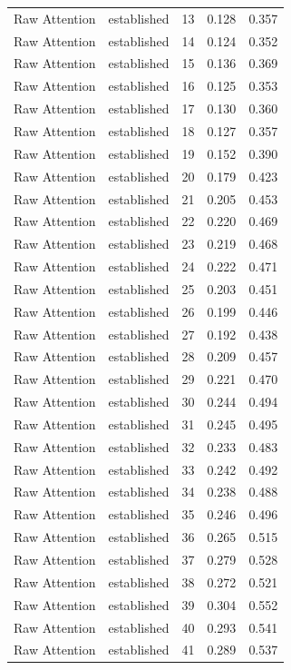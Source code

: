 \begin{tabular}{llrrr}
Raw Attention & established & 13 & 0.128 & 0.357 \\
Raw Attention & established & 14 & 0.124 & 0.352 \\
Raw Attention & established & 15 & 0.136 & 0.369 \\
Raw Attention & established & 16 & 0.125 & 0.353 \\
Raw Attention & established & 17 & 0.130 & 0.360 \\
Raw Attention & established & 18 & 0.127 & 0.357 \\
Raw Attention & established & 19 & 0.152 & 0.390 \\
Raw Attention & established & 20 & 0.179 & 0.423 \\
Raw Attention & established & 21 & 0.205 & 0.453 \\
Raw Attention & established & 22 & 0.220 & 0.469 \\
Raw Attention & established & 23 & 0.219 & 0.468 \\
Raw Attention & established & 24 & 0.222 & 0.471 \\
Raw Attention & established & 25 & 0.203 & 0.451 \\
Raw Attention & established & 26 & 0.199 & 0.446 \\
Raw Attention & established & 27 & 0.192 & 0.438 \\
Raw Attention & established & 28 & 0.209 & 0.457 \\
Raw Attention & established & 29 & 0.221 & 0.470 \\
Raw Attention & established & 30 & 0.244 & 0.494 \\
Raw Attention & established & 31 & 0.245 & 0.495 \\
Raw Attention & established & 32 & 0.233 & 0.483 \\
Raw Attention & established & 33 & 0.242 & 0.492 \\
Raw Attention & established & 34 & 0.238 & 0.488 \\
Raw Attention & established & 35 & 0.246 & 0.496 \\
Raw Attention & established & 36 & 0.265 & 0.515 \\
Raw Attention & established & 37 & 0.279 & 0.528 \\
Raw Attention & established & 38 & 0.272 & 0.521 \\
Raw Attention & established & 39 & 0.304 & 0.552 \\
Raw Attention & established & 40 & 0.293 & 0.541 \\
Raw Attention & established & 41 & 0.289 & 0.537 \\

\end{tabular}
